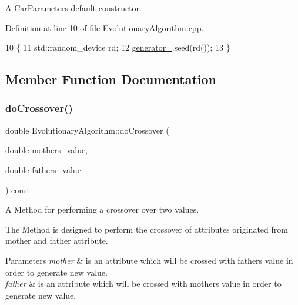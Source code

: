 A \hyperlink{classCarParameters}{Car\+Parameters} default constructor. 



Definition at line 10 of file Evolutionary\+Algorithm.\+cpp.


\begin{DoxyCode}
10                                              \{
11     std::random\_device rd;
12     \hyperlink{classEvolutionaryAlgorithm_adbd823d385ad95bf20496fd2fc25ccde}{generator\_}.seed(rd());
13 \}
\end{DoxyCode}


\subsection{Member Function Documentation}
\mbox{\label{classEvolutionaryAlgorithm_a1f0c3d66b8abfdcdf6eedf065580cef6}} 
\subsubsection{\texorpdfstring{do\+Crossover()}{doCrossover()}\hspace{0.1cm}{\footnotesize\ttfamily [1/2]}}
{\footnotesize\ttfamily double Evolutionary\+Algorithm\+::do\+Crossover (\begin{DoxyParamCaption}\item[{double}]{mothers\+\_\+value,  }\item[{double}]{fathers\+\_\+value }\end{DoxyParamCaption}) const\hspace{0.3cm}{\ttfamily [private]}}



A Method for performing a crossover over two values. 

The Method is designed to perform the crossover of attributes originated from mother and father attribute. 
\begin{DoxyParams}{Parameters}
{\em mother} & is an attribute which will be crossed with father\textquotesingle{}s value in order to generate new value. \\
\hline
{\em father} & is an attribute which will be crossed with mother\textquotesingle{}s value in order to generate new value. \\
\hline
\end{DoxyParams}


